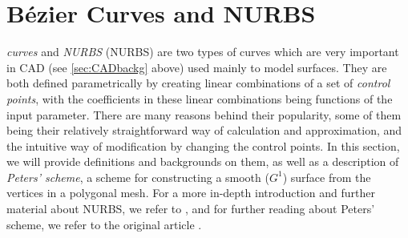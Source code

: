 \section{B{\'e}zier Curves and \acs{NURBS}}
\label{sec:NURBS}


\emph{\Bez curves} and \emph{\acl{NURBS}} (\acs{NURBS}) are two types of curves which are very important in CAD (see \autoref{sec:CADbackg} above) used mainly to model surfaces. They are both defined parametrically by creating linear combinations of a set of \emph{control points}, with the coefficients in these linear combinations being functions of the input parameter. There are many reasons behind their popularity, some of them being their relatively straightforward way of calculation and approximation, and the intuitive way of modification by changing the control points. In this section, we will provide definitions and backgrounds on them, as well as a description of \emph{Peters' scheme}, a scheme for constructing a smooth ($G^1$) surface from the vertices in a polygonal mesh. For a  more in-depth introduction and further material about NURBS, we refer to \cite{farin2002handbook}, and for further reading about Peters' scheme, we refer to the original article \cite{peters1992constructing}.




